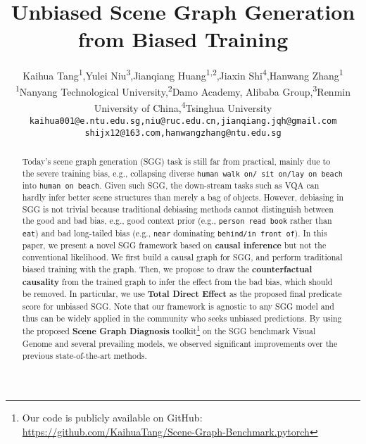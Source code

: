 \documentclass[10pt,twocolumn,letterpaper]{article}
\begin{document}
\title{Unbiased Scene Graph Generation from Biased Training}


\author{
    Kaihua Tang\textsuperscript{1},\quad Yulei Niu\textsuperscript{3},\quad Jianqiang Huang\textsuperscript{1,2},\quad Jiaxin Shi\textsuperscript{4},\quad Hanwang Zhang\textsuperscript{1}\\
    {\small \textsuperscript{1}Nanyang Technological University,\quad \textsuperscript{2}Damo Academy, Alibaba Group,\quad \textsuperscript{3}Renmin University of China,\quad \textsuperscript{4}Tsinghua University}\\
    {\tt\small kaihua001@e.ntu.edu.sg,\quad niu@ruc.edu.cn,\quad jianqiang.jqh@gmail.com}\\
    {\tt\small shijx12@163.com,\quad hanwangzhang@ntu.edu.sg}
}

\maketitle



\begin{abstract}
Today's scene graph generation (SGG) task is still far from practical, mainly due to the severe training bias, e.g., collapsing diverse \texttt{human walk on/ sit on/lay on beach} into \texttt{human on beach}. Given such SGG, the down-stream tasks such as VQA can hardly infer better scene structures than merely a bag of objects. However, debiasing in SGG is not trivial because traditional debiasing methods cannot distinguish between the good and bad bias, e.g., good context prior (e.g., \texttt{person read book} rather than \texttt{eat}) and bad long-tailed bias (e.g., \texttt{near} dominating \texttt{behind/in front of}). In this paper, we present a novel SGG framework based on \textbf{causal inference} but not the conventional likelihood. We first build a causal graph for SGG, and perform traditional biased training with the graph. Then, we propose to draw the \textbf{counterfactual causality} from the trained graph to infer the effect from the bad bias, which should be removed. In particular, we use \textbf{Total Direct Effect} as the proposed final predicate score for unbiased SGG. Note that our framework is agnostic to any SGG model and thus can be widely applied in the community who seeks unbiased predictions. By using the proposed \textbf{Scene Graph Diagnosis} toolkit\footnote{Our code is publicly available on GitHub: \url{https://github.com/KaihuaTang/Scene-Graph-Benchmark.pytorch}} on the SGG benchmark Visual Genome and several prevailing models, we observed significant improvements over the previous state-of-the-art methods.
\end{abstract} 
\end{document}
